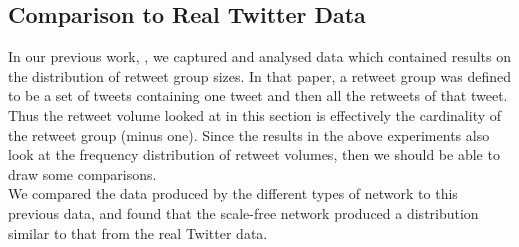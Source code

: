 \subsection{Comparison to Real Twitter Data}
In our previous work, \cite{webberley11}, we captured and analysed data which contained results on the distribution of retweet group sizes. In that paper, a retweet group was defined to be a set of tweets containing one tweet and then all the retweets of that tweet. Thus the retweet volume looked at in this section is effectively the cardinality of the retweet group (minus one). Since the results in the above experiments also look at the frequency distribution of retweet volumes, then we should be able to draw some comparisons.
\\
We compared the data produced by the different types of network to this previous data, and found that the scale-free network produced a distribution similar to that from the real Twitter data.
\begin{figure}[h]
\end{figure}

